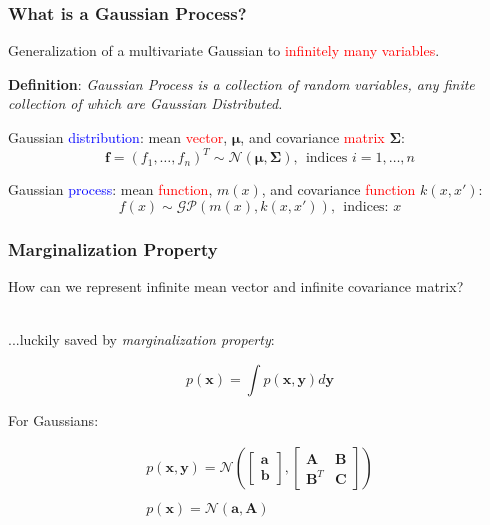 \documentclass[10pt]{beamer}
\newcommand{\bx}{\mathbf{x}}
\newcommand{\by}{\mathbf{y}}
\newcommand{\ba}{\mathbf{a}}
\newcommand{\bb}{\mathbf{b}}
\newcommand{\bA}{\mathbf{A}}
\newcommand{\bB}{\mathbf{B}}
\newcommand{\bC}{\mathbf{C}}
\newcommand{\gp}{\mathcal{GP}}
\newcommand{\gaussN}{\mathcal{N}}
\newcommand{\bmu}{\boldsymbol{\mu}}
\newcommand{\bSig}{\boldsymbol{\Sigma}}
\begin{document}
  \begin{frame}
    \frametitle{What is a Gaussian Process?}
    Generalization of a multivariate Gaussian to \textcolor{red}{infinitely many variables}.

    \begin{block}{}
      \textbf{Definition}: \emph{Gaussian Process is a collection of random variables, any finite collection of which are Gaussian Distributed.}
    \end{block}

    Gaussian \textcolor{blue}{distribution}: mean \textcolor{red}{vector}, $\bmu$, and covariance \textcolor{red}{matrix} $\bSig$:
    \begin{equation*}
      \mathbf{f} = (f_1,\dots,f_n)^T \sim \gaussN(\bmu,\bSig),~~\text{indices } i = 1,\dots,n
    \end{equation*}

    Gaussian \textcolor{blue}{process}: mean \textcolor{red}{function}, $m(x)$, and covariance \textcolor{red}{function} $k(x,x')$:
    \begin{equation*}
      f(x) \sim \gp(m(x),k(x,x')),~~\text{indices: } x
    \end{equation*}
  \end{frame}

  \begin{frame}
    \frametitle{Marginalization Property}
    How can we represent infinite mean vector and infinite covariance matrix? \\~

    ...luckily saved by \emph{marginalization property}:

    \begin{equation*}
      p(\bx) = \int p(\bx,\by)d \by
    \end{equation*}

    For Gaussians:

    \begin{equation*}
      \begin{array}{c}
        p(\bx, \by) = \gaussN \left(\begin{bmatrix} \ba \\ \bb \end{bmatrix}, \begin{bmatrix} \bA & \bB \\ \bB^T & \bC \end{bmatrix} \right) \\~\\
        p(\bx) = \gaussN(\ba,\bA)
      \end{array}
    \end{equation*}
  \end{frame}
\end{document}
